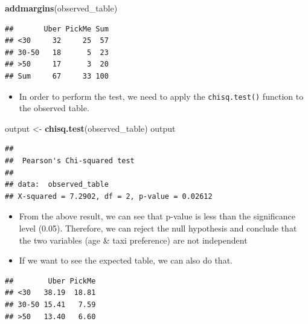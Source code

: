 \documentclass[]{book}
\newenvironment{Shaded}{\begin{snugshade}}{\end{snugshade}}
\newcommand{\KeywordTok}[1]{\textcolor[rgb]{0.13,0.29,0.53}{\textbf{#1}}}
\newcommand{\NormalTok}[1]{#1}
\newcommand{\OperatorTok}[1]{\textcolor[rgb]{0.81,0.36,0.00}{\textbf{#1}}}
\newcommand{\StringTok}[1]{\textcolor[rgb]{0.31,0.60,0.02}{#1}}
\providecommand{\tightlist}{%
  \setlength{\itemsep}{0pt}\setlength{\parskip}{0pt}}
\begin{document}
\begin{Shaded}
\begin{Highlighting}[]
\KeywordTok{addmargins}\NormalTok{(observed_table)}
\end{Highlighting}
\end{Shaded}

\begin{verbatim}
##       Uber PickMe Sum
## <30     32     25  57
## 30-50   18      5  23
## >50     17      3  20
## Sum     67     33 100
\end{verbatim}

\begin{itemize}
\tightlist
\item
  In order to perform the test, we need to apply the \texttt{chisq.test()} function to the observed table.
\end{itemize}

\begin{Shaded}
\begin{Highlighting}[]
\NormalTok{output <-}\StringTok{ }\KeywordTok{chisq.test}\NormalTok{(observed_table)}
\NormalTok{output}
\end{Highlighting}
\end{Shaded}

\begin{verbatim}
## 
##  Pearson's Chi-squared test
## 
## data:  observed_table
## X-squared = 7.2902, df = 2, p-value = 0.02612
\end{verbatim}

\begin{itemize}
\item
  From the above result, we can see that p-value is less than the significance level (0.05). Therefore, we can reject the null hypothesis and conclude that the two variables (age \& taxi preference) are not independent
\item
  If we want to see the expected table, we can also do that.
\end{itemize}

\begin{Shaded}
\end{Shaded}

\begin{verbatim}
##        Uber PickMe
## <30   38.19  18.81
## 30-50 15.41   7.59
## >50   13.40   6.60
\end{verbatim}
\end{document}
